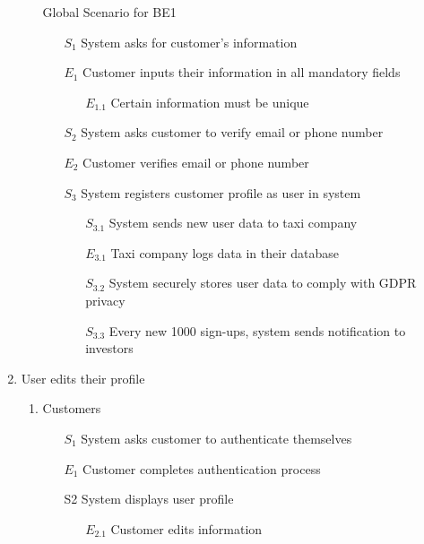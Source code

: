 \documentclass[]{article}
\begin{document}
\begin{enumerate}[{\textbf{BE}}1.]
\begin{enumerate}[{\textbf{VP}1}.1]
\begin{enumerate}
            \end{enumerate}
        \item[Global] Scenario for BE1
            \begin{enumerate}
                \item[$S_1$] System asks for customer’s information
                \item[$E_1$] Customer inputs their information in all mandatory fields
                \begin{enumerate}
                \item[$E_{1.1}$] Certain information must be unique
                \end{enumerate}
                \item[$S_2$] System asks customer to verify email or phone number
                \item[$E_2$] Customer verifies email or phone number
                \item[$S_3$] System registers customer profile as user in system
                \begin{enumerate}
                \item[$S_{3.1}$] System sends new user data to taxi company
                \item[$E_{3.1}$] Taxi company logs data in their database
                \item[$S_{3.2}$] System securely stores user data to comply with GDPR privacy
\color{blue}
                \item[$S_{3.3}$] Every new 1000 sign-ups, system sends notification to investors
\color{black}
                \end{enumerate}
            \end{enumerate}
    \end{enumerate}
    \item User edits their profile
    \begin{enumerate}[{VP2}.1]
        \item Customers
            \begin{enumerate}
                \item[$S_1$] System asks customer to authenticate themselves
                    \item[$E_1$] Customer completes authentication process
                \item[S2] System displays user profile
                \begin{enumerate}
                    \item[$E_{2.1}$] Customer edits information

\end{enumerate}
\end{enumerate}
\end{enumerate}
\end{enumerate}
\end{document}
